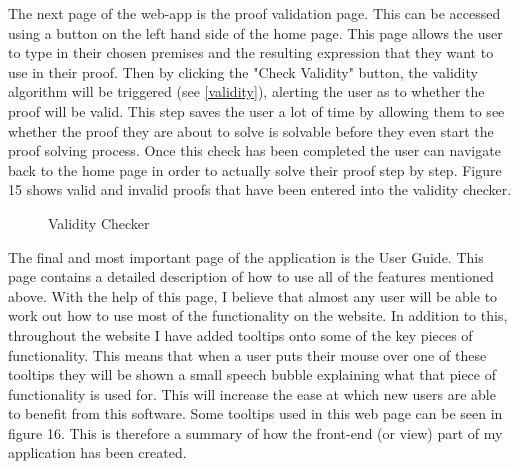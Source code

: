The next page of the web-app is the proof validation page. This can be accessed using a button on the left hand side of the home page. This page allows the user to type in their chosen premises and the resulting expression that they want to use in their proof. Then by clicking the "Check Validity" button, the validity algorithm will be triggered (see \ref{validity}), alerting the user as to whether the proof will be valid. This step saves the user a lot of time by allowing them to see whether the proof they are about to solve is solvable before they even start the proof solving process. Once this check has been completed the user can navigate back to the home page in order to actually solve their proof step by step. Figure 15 shows valid and invalid proofs that have been entered into the validity checker.

\begin{figure}[!ht]
	\centering
	\caption{Validity Checker}
\end{figure}
\pagebreak

The final and most important page of the application is the User Guide. This page contains a detailed description of how to use all of the features mentioned above. With the help of this page, I believe that almost any user will be able to work out how to use most of the functionality on the website. In addition to this, throughout the website I have added tooltips onto some of the key pieces of functionality. This means that when a user puts their mouse over one of these tooltips they will be shown a small speech bubble explaining what that piece of functionality is used for. This will increase the ease at which new users are able to benefit from this software. Some tooltips used in this web page can be seen in figure 16. This is therefore a summary of how the front-end (or view) part of my application has been created.

